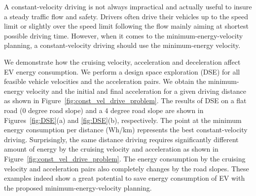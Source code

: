 \documentclass{IEEEtran}
\begin{document}
A constant-velocity driving is not always impractical and actually  useful to insure a steady  traffic flow and safety. Drivers often drive their vehicles up to the speed limit or slightly over the speed limit following the flow mainly aiming at shortest possible driving time. However, when it comes to the minimum-energy-velocity planning, a constant-velocity driving should use the minimum-energy velocity. 

We demonstrate how the cruising velocity, acceleration and deceleration affect EV energy consumption. We perform a design space exploration (DSE) for all feasible vehicle velocities and the acceleration pairs. We obtain the minimum-energy velocity and the initial and final acceleration for a given driving distance  as shown in Figure~\ref{fig:const_vel_drive_problem}. The results of DSE on a flat road (0 degree road slope) and a 4 degree road slope are shown in Figures~\ref{fig:DSE}(a) and \ref{fig:DSE}(b), respectively. The point at the minimum energy consumption per distance (Wh/km) represents the best constant-velocity driving. Surprisingly, the same distance driving requires significantly different amount of energy by the cruising velocity and acceleration as shown in Figure~\ref{fig:const_vel_drive_problem}. The energy consumption by the cruising velocity and acceleration pairs also completely changes by the road slopes. These examples indeed show a great potential to save energy consumption of EV with the proposed minimum-energy-velocity planning.
\end{document}
